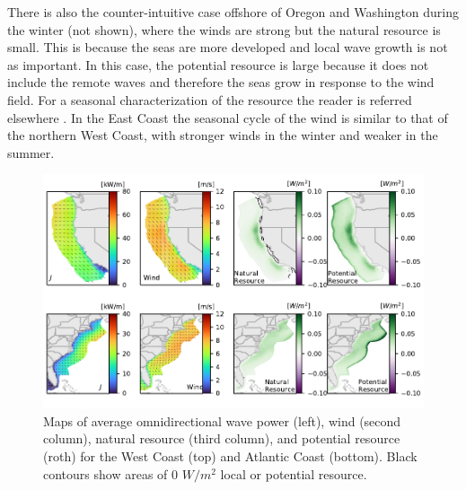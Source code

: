 There is also the counter-intuitive case offshore of Oregon and Washington during the winter (not shown), where the winds are strong but the natural resource is small. This is because the seas are more developed and local wave growth is not as important. In this case, the potential resource is large because it does not include the remote waves and therefore the seas grow in response to the wind field. For a seasonal characterization of the resource the reader is referred elsewhere  \citep[e.g.][]{garcia-medinaWaveResourceAssessment2014,lenee-bluhm_characterizing_2011,yangCharacteristicsVariabilityNearshore2020,garciamedinaWaveResourceCharacterization2021,ahnNearshoreWaveEnergy2021,liWaveEnergyResources2021}. In the East Coast the seasonal cycle of the wind is similar to that of the northern West Coast, with stronger winds in the winter and weaker in the summer.


\begin{figure}[ht]
  \centering
  \includegraphics[width=\textwidth]{../fig/Yearly_spatial_seasonal_mag_6.pdf}
  \caption{Maps of average omnidirectional wave power (left), wind (second column), natural resource (third column), and potential resource (roth) for the West Coast (top) and Atlantic Coast (bottom). Black contours show areas of 0 $W/m^{2}$ local or potential resource.}
  \label{fig:maps}
\end{figure}


